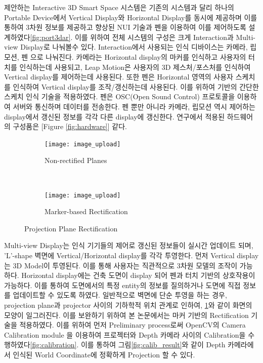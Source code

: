 제안하는 Interactive 3D Smart Space 시스템은 기존의 시스템과 달리 하나의 Portable Device에서 Vertical Display와 Horizontal Display를 동시에 제공하며 이를 통하여 3차원 정보를 제공하고 향상된 NUI 기술과 펜을 이용하여 이를 제어하도록 설계하였다\ref{fig:port3dar}. 이를 위하여 전체 시스템의 구성은 크게 Interaction과 Multi-view Display로 나눠볼수 있다. Interaction에서 사용되는 인식 디바이스는 카메라, 립모션, 펜 으로 나눠진다. 카메라는 Horizontal display의 마커를 인식하고 사용자의 터치를 인식하는데 사용되고, Leap Motion은 사용자의 3D 제스처/포스처를 인식하여 Vertical display를 제어하는데 사용된다. 또한 펜은 Horizontal 영역의 사용자 스케치를 인식하여 Vertical display를 조작/갱신하는데 사용된다. 이를 위하여 \cite{wobbrock_gestures_2007} 기반의 간단한 스케치 인식 기술을 적용하였다. 펜은 OSC(Open Sound Control) 프로토콜\cite {wright_open_1997}을 이용하여 서버와 통신하며 데이터를 전송한다. 펜 뿐만 아니라 카메라, 립모션 역시 제어하는 display에서 갱신된 정보를 각각 다른 display에 갱신한다. 연구에서 적용된 하드웨어의 구성품은  [Figure \ref {fig:hardware}] 같다.



\begin{figure}[!h]
	\centering
        \begin{subfigure}[b]{1.0\columnwidth}
	        \centering
                \texttt{[image: image\_upload]}
                \caption{Non-rectified Planes}
                \label{fig:non-rectified}
        \end{subfigure}%
        \\
        \begin{subfigure}[b]{1.0\columnwidth}
            \centering
            \texttt{[image: image\_upload]}
                \caption{Marker-based Rectification}
                \label{fig:marker_rectify}
        \end{subfigure}
	\caption{Projection Plane Rectification}
    \label{fig:rectification}
\end{figure}


Multi-view Display는 인식 기기들의 제어로 갱신된 정보들이 실시간 업데이트 되며, 'L'-shape 벽면에 Vertical/Horizontal display를 각각 투영한다. 먼저 Vertical display는 3D Model이 투영된다. 이를 통해 사용자는 직관적으로 3차원 모델의 조작이 가능하다. Horizontal display에는 건축 도면이 display 되어 펜과 터치 기반의 상호작용이 가능하다. 이를 통하여 도면에서의 특정 entity의 정보를 질의하거나 도면에 직접 정보를 업데이트할 수 있도록 하였다. 일반적으로 벽면에 단순 투영을 하는 경우, projection plane과 projector 사이의 기하학적 위치 관계로 인하여, \ref{fig:non-rectified}와 같이 화면의 모양이 일그러진다. 이를 보완하기 위하여 본 논문에서는 마커 기반의 Rectification 기술을 적용하였다. 
이를 위하여 먼저 Preliminary process로써 OpenCV의 Camera Calibration module \cite{opencv_2.4.8.0_documentation_camera_????}을 이용하여 프로젝터와 Depth 카메라 사이의 Calibration을 수행하였다\ref{fig:calibration}. 이를 통하여 그림\ref{fig:calib_result}와 같이 Depth 카메라에서 인식된 World Coordinate에 정확하게 Projection 할 수 있다. 

